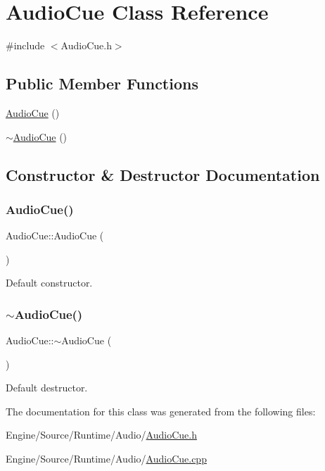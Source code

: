 \hypertarget{class_audio_cue}{}\section{Audio\+Cue Class Reference}
\label{class_audio_cue}


{\ttfamily \#include $<$Audio\+Cue.\+h$>$}

\subsection*{Public Member Functions}
\begin{DoxyCompactItemize}
\item 
\mbox{\hyperlink{class_audio_cue_a5a28ab84a790e98e67fc433b117fb71d}{Audio\+Cue}} ()
\item 
\mbox{\hyperlink{class_audio_cue_a0055a983611df3b4581fe88bcb3c7505}{$\sim$\+Audio\+Cue}} ()
\end{DoxyCompactItemize}


\subsection{Constructor \& Destructor Documentation}
\mbox{\label{class_audio_cue_a5a28ab84a790e98e67fc433b117fb71d}} 
\subsubsection{\texorpdfstring{Audio\+Cue()}{AudioCue()}}
{\footnotesize\ttfamily Audio\+Cue\+::\+Audio\+Cue (\begin{DoxyParamCaption}{ }\end{DoxyParamCaption})}

Default constructor. \mbox{\label{class_audio_cue_a0055a983611df3b4581fe88bcb3c7505}} 
\subsubsection{\texorpdfstring{$\sim$\+Audio\+Cue()}{~AudioCue()}}
{\footnotesize\ttfamily Audio\+Cue\+::$\sim$\+Audio\+Cue (\begin{DoxyParamCaption}{ }\end{DoxyParamCaption})}

Default destructor. 

The documentation for this class was generated from the following files\+:\begin{DoxyCompactItemize}
\item 
Engine/\+Source/\+Runtime/\+Audio/\mbox{\hyperlink{_audio_cue_8h}{Audio\+Cue.\+h}}\item 
Engine/\+Source/\+Runtime/\+Audio/\mbox{\hyperlink{_audio_cue_8cpp}{Audio\+Cue.\+cpp}}\end{DoxyCompactItemize}
